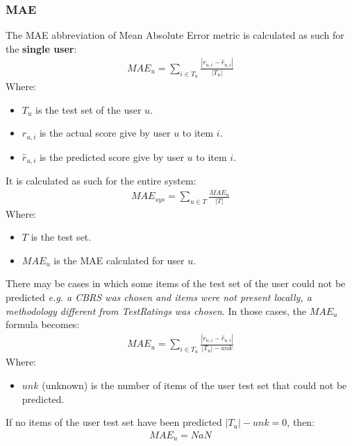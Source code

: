 \documentclass[11pt]{article}
\begin{document}
\subsubsection{MAE}\label{subsubsec:mae}
The MAE abbreviation of Mean Absolute Error metric is calculated as such for the \textbf{single user}:
\hfill\break
\hfill\break
    \[
      \begin{gathered}
          MAE_u = \sum_{i \in T_u} \frac{|r_{u,i} - \hat{r}_{u,i}|}{|T_u|}
      \end{gathered}
    \]
\hfill\break
\hfill\break
    Where:
\begin{itemize}
    \item $T_u$ is the test set of the user $u$.
    \item $r_{u, i}$ is the actual score give by user $u$ to item $i$.
    \item $\hat{r}_{u, i}$ is the predicted score give by user $u$ to item $i$.
\end{itemize}
\hfill\break
\hfill\break
It is calculated as such for the entire system:
\hfill\break
\hfill\break
    \[
       \begin{gathered}
           MAE_{sys} = \sum_{u \in T} \frac{MAE_u}{|T|}
       \end{gathered}
    \]
\hfill\break
\hfill\break
    Where:
\begin{itemize}
    \item $T$ is the test set.
    \item $MAE_u$ is the MAE calculated for user $u$.
\end{itemize}
\hfill\break
\hfill\break
There may be cases in which some items of the test set of the user could not be predicted
\textit{e.g. a CBRS was chosen and items were not present locally, a methodology different from TestRatings was chosen}.
In those cases, the $MAE_u$ formula becomes:
\hfill\break
\hfill\break
    \[
      \begin{gathered}
          MAE_u = \sum_{i \in T_u} \frac{|r_{u,i} - \hat{r}_{u,i}|}{|T_u| - unk}
      \end{gathered}
    \]
\hfill\break
\hfill\break
    Where:
\begin{itemize}
    \item $unk$ (unknown) is the number of items of the user test set that could not be predicted.
\end{itemize}
\hfill\break
\hfill\break
If no items of the user test set have been predicted $|T_u| - unk = 0$, then:
\hfill\break
\hfill\break
    \[
        \begin{gathered}
            MAE_u = NaN
        \end{gathered}
    \]
\hfill\break
\hfill\break
\end{document}
